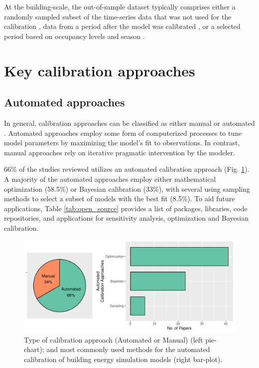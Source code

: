 \documentclass[review]{elsarticle}
\begin{document}
At the building-scale, the out-of-sample dataset typically comprises either a randomly sampled subset of the time-series data that was not used for the calibration \cite{chong2017bayesian, chong2018guidelines}, data from a period after the model was calibrated \cite{yuan2017simultaneous, yin2016linking, li2016assessment, chen2019meta, manfren2020parametric, yang2015model}, or a selected period based on occupancy levels and season \cite{odonovan2019predicting}. 


\section{Key calibration approaches}

\subsection{Automated approaches}

In general, calibration approaches can be classified as either manual or automated \cite{coakley2014review}. Automated approaches employ some form of computerized processes to tune model parameters by maximizing the model's fit to observations. In contrast, manual approaches rely on iterative pragmatic intervention by the modeler. 

66\% of the studies reviewed utilizes an automated calibration approach (Fig. \ref{fig:auto_manual}). A majority of the automated approaches employ either mathematical optimization (58.5\%) or Bayesian calibration (33\%), with several using sampling methods to select a subset of models with the best fit (8.5\%). To aid future applications, Table \ref{tab:open_source} provides a list of packages, libraries, code repositories, and applications for sensitivity analysis, optimization and Bayesian calibration. 

\begin{figure}[!h]
\centering
\includegraphics[width=\textwidth]{figures/auto_manual.pdf}
\caption{Type of calibration approach (Automated or Manual) (left pie-chart); and most commonly used methods for the automated calibration of building energy simulation models (right bar-plot).}
\label{fig:auto_manual}
\end{figure}
\end{document}
